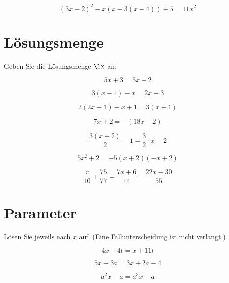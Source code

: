 {\begin{bbwAufgabenBlock}
\item $$(3x-2)^2 -x(x-3(x-4))  + 5 = 11x^2$$

\end{bbwAufgabenBlock}
\newpage


\section{Lösungsmenge}
Geben Sie die Lösungsmenge $\lx$ an:

\begin{bbwAufgabenBlock}

\item $$5x+3 = 5x-2$$
\LoesungsBlock{$\lx=\{\}$}

\item $$3(x-1)-x = 2x-3$$

\item $$2(2x-1)-x+1 = 3(x+1)$$
\LoesungsBlock{$\lx=\{\}$}

\item $$7x+2 = -(18x - 2)$$

\item $$\frac{3(x+2)}2 - 1 = \frac32 \cdot{} x + 2$$

\item $$5x^2 + 2 = -5(x+2)(-x+2)$$
\LoesungsBlock{$\lx=\{\}$}

\item $$\frac{x}{10} + \frac{75}{77} = \frac{7x+6}{14} - \frac{22x-30}{55}$$

\end{bbwAufgabenBlock}
\newpage
\section{Parameter}
Lösen Sie jeweils nach $x$ auf. (Eine Fallunterscheidung ist nicht verlangt.)
\begin{bbwAufgabenBlock}
\item $$4x-4t = x+ 11t$$

\item $$5x-3a = 3x+2a-4$$

\item $$a^2x+a = a^3x -a$$


\end{bbwAufgabenBlock}}
